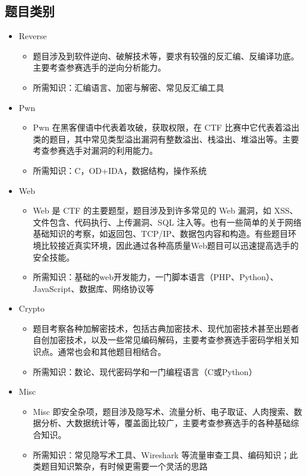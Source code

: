 \subsection{题目类别}
\indent \setlength{\parindent}{2em}

\begin{itemize}
    \item Reverse
    \begin{itemize}
        \item 题目涉及到软件逆向、破解技术等，要求有较强的反汇编、反编译功底。主要考查参赛选手的逆向分析能力。
        \item 所需知识：汇编语言、加密与解密、常见反汇编工具
    \end{itemize}
    
    \item Pwn
    \begin{itemize}
        \item Pwn 在黑客俚语中代表着攻破，获取权限，在 CTF 比赛中它代表着溢出类的题目，其中常见类型溢出漏洞有整数溢出、栈溢出、堆溢出等。主要考查参赛选手对漏洞的利用能力。
        \item 所需知识：C，OD+IDA，数据结构，操作系统
    \end{itemize}
    
    \item Web
    \begin{itemize}
        \item Web 是 CTF 的主要题型，题目涉及到许多常见的 Web 漏洞，如 XSS、文件包含、代码执行、上传漏洞、SQL 注入等。也有一些简单的关于网络基础知识的考察，如返回包、TCP/IP、数据包内容和构造。有些题目环境比较接近真实环境，因此通过各种高质量Web题目可以迅速提高选手的安全技能。
        \item 所需知识：基础的web开发能力，一门脚本语言（PHP、Python）、JavaScript、数据库、网络协议等
    \end{itemize}
   
    \item Crypto
    \begin{itemize}
        \item 题目考察各种加解密技术，包括古典加密技术、现代加密技术甚至出题者自创加密技术，以及一些常见编码解码，主要考查参赛选手密码学相关知识点。通常也会和其他题目相结合。
        \item 所需知识：数论、现代密码学和一门编程语言（C或Python）
    \end{itemize}
    
    \item Misc
    \begin{itemize}
        \item Misc 即安全杂项，题目涉及隐写术、流量分析、电子取证、人肉搜索、数据分析、大数据统计等，覆盖面比较广，主要考查参赛选手的各种基础综合知识。
        \item 所需知识：常见隐写术工具、Wireshark 等流量审查工具、编码知识；此类题目知识繁杂，有时候更需要一个灵活的思路
    \end{itemize}
    

\end{itemize}
